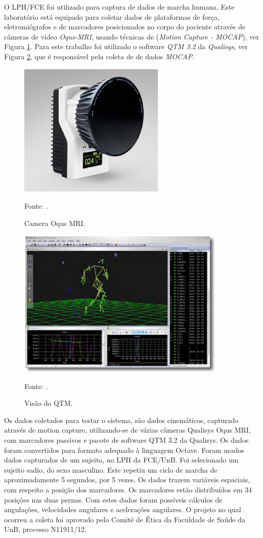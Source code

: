 O LPH/FCE foi utilizado para captura de dados de marcha humana. 
Este laboratório está equipado para coletar dados de plataformas de força, eletromiógrafos e de marcadores posicionados no corpo do paciente através de câmeras de vídeo \emph{Oqus-MRI}, usando técnicas de (\emph{Motion Capture - MOCAP}), ver Figura \ref{oqus_mri}. 
Para este trabalho foi utilizado o software \emph{QTM 3.2} da \emph{Qualisys}, ver Figura \ref{visao_qtm}, que é responsável pela coleta de de dados \emph{MOCAP}. 

\begin{figure}[ht]
	\centering
	\includegraphics[width=7cm]{figuras/oqus-mri.eps}
	\caption{Camera Oqus MRI.}
	\label{oqus_mri}
	\footnotesize Fonte: \cite{Qualisys2013}.
\end{figure}


\begin{figure}[ht]
	\centering
	\includegraphics[width=10cm]{figuras/qtm.eps}
	\caption{Visão do QTM.}
	\label{visao_qtm}
	\footnotesize Fonte: \cite{Qualisys2010}.
\end{figure}

Os dados coletados para testar o sistema, são
dados cinemáticos, capturado através de motion capture,
utilizando-se de várias câmeras Qualisys Oqus MRI,
com marcadores passivos e pacote de software QTM 3.2
da Qualisys. Os dados foram convertidos para formato
adequado à linguagem Octave. Foram usados dados
capturados de um sujeito, no LPH da FCE/UnB.
Foi selecionado um sujeito sadio, do sexo masculino.
Este repetiu um ciclo de marcha de aproximadamente 5
segundos, por 5 vezes. Os dados trazem variáveis
espaciais, com respeito a posição dos marcadores. Os
marcadores estão distribuídos em 34 posições nas duas
pernas. Com estes
dados foram possíveis cálculos de angulações,
velocidades angulares e acelerações angulares. 
O projeto no qual ocorreu a coleta foi aprovado
pelo Comitê de Ética da Faculdade de Saúde da UnB,
processo N11911/12.
